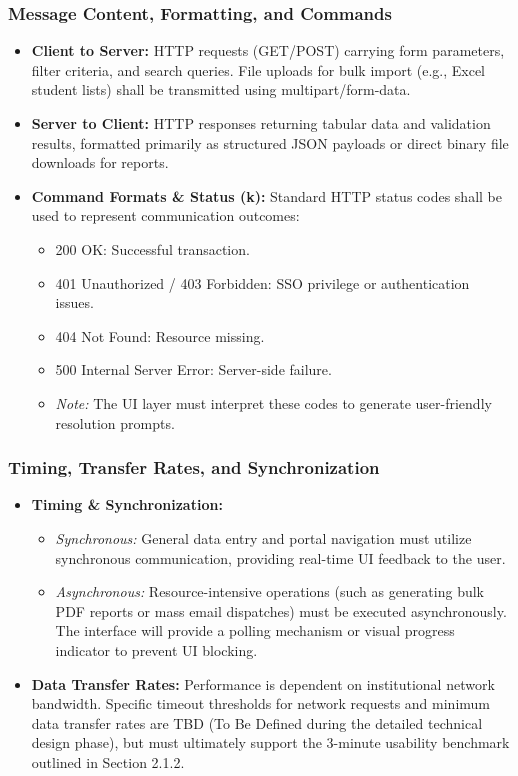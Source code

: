 \documentclass[11pt, a4paper]{article}
\begin{document}
\subsubsection{Message Content, Formatting, and Commands}
\begin{itemize}
    \item \textbf{Client to Server:} HTTP requests (GET/POST) carrying form parameters, filter criteria, and search queries. File uploads for bulk import (e.g., Excel student lists) shall be transmitted using multipart/form-data.
    \item \textbf{Server to Client:} HTTP responses returning tabular data and validation results, formatted primarily as structured JSON payloads or direct binary file downloads for reports.
    \item \textbf{Command Formats \& Status (k):} Standard HTTP status codes shall be used to represent communication outcomes:
    \begin{itemize}
        \item 200 OK: Successful transaction.
        \item 401 Unauthorized / 403 Forbidden: SSO privilege or authentication issues.
        \item 404 Not Found: Resource missing.
        \item 500 Internal Server Error: Server-side failure.
        \item \textit{Note:} The UI layer must interpret these codes to generate user-friendly resolution prompts.
    \end{itemize}
\end{itemize}

\subsubsection{Timing, Transfer Rates, and Synchronization}
\begin{itemize}
    \item \textbf{Timing \& Synchronization:}
    \begin{itemize}
        \item \textit{Synchronous:} General data entry and portal navigation must utilize synchronous communication, providing real-time UI feedback to the user.
        \item \textit{Asynchronous:} Resource-intensive operations (such as generating bulk PDF reports or mass email dispatches) must be executed asynchronously. The interface will provide a polling mechanism or visual progress indicator to prevent UI blocking.
    \end{itemize}
    \item \textbf{Data Transfer Rates:} Performance is dependent on institutional network bandwidth. Specific timeout thresholds for network requests and minimum data transfer rates are TBD (To Be Defined during the detailed technical design phase), but must ultimately support the 3-minute usability benchmark outlined in Section 2.1.2.
\end{itemize}
\end{document}
